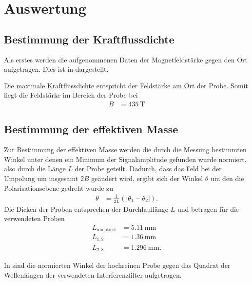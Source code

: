 \section{Auswertung}
\label{sec:Auswertung}


\subsection{Bestimmung der Kraftflussdichte}
\label{sub:Kraftflussdichte}

Als erstes werden die aufgenommenen Daten der Magnetfeldstärke gegen den Ort aufgetragen.
Dies ist in
dargestellt.


Die maximale Kraftflussdichte entspricht der Feldstärke am Ort der Probe.
Somit liegt die Feldstärke im Bereich der Probe bei 
\begin{align*}
  B &= \qty{435}{\tesla}
\end{align*}

\subsection{Bestimmung der effektiven Masse}
\label{sub:effektiveMasse}

Zur Bestimmung der effektiven Masse werden die durch die Messung bestimmten Winkel unter denen ein Minimum der Signalamplitude gefunden wurde
normiert, also durch die Länge $L$ der Probe geteilt.
Dadurch, dass das Feld bei der Umpolung um insgesamt $\num{2}B$ geändert wird, ergibt sich der Winkel $\theta$ um den die Polarisationsebene
gedreht wurde zu
\begin{align}
  \theta &= \frac{1}{2L}(\lvert \theta_1-\theta_2 \rvert).
\end{align}
Die Dicken der Proben entsprechen der Durchlauflänge $L$ und betragen für die verwendeten Proben
\begin{align*}
  L_{\text{undotiert}}&= \qty{5.11}{\milli\meter}\\
  L_{1,2}&= \qty{1.36}{\milli\meter}\\
  L_{2,8}&= \qty{1.296}{\milli\meter}.
\end{align*}

In
sind die normierten Winkel der hochreinen Probe gegen das Quadrat der Wellenlängen der verwendeten Interferenzfilter aufgetragen.

